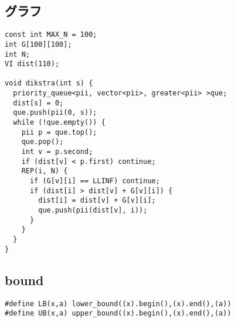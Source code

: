 \documentclass{jsarticle}
\begin{document}
\subsection*{グラフ}
\begin{lstlisting}[caption=ダイクストラ]
const int MAX_N = 100;
int G[100][100];
int N;
VI dist(110);
  
void dikstra(int s) {
  priority_queue<pii, vector<pii>, greater<pii> >que;
  dist[s] = 0;
  que.push(pii(0, s));
  while (!que.empty()) {
    pii p = que.top();
    que.pop();
    int v = p.second;
    if (dist[v] < p.first) continue;
    REP(i, N) {
      if (G[v][i] == LLINF) continue;
      if (dist[i] > dist[v] + G[v][i]) {
        dist[i] = dist[v] + G[v][i];
        que.push(pii(dist[v], i));
      }
    }
  }
}
\end{lstlisting}

\subsection*{bound}
\begin{lstlisting}[caption=bound]
#define LB(x,a) lower_bound((x).begin(),(x).end(),(a))
#define UB(x,a) upper_bound((x).begin(),(x).end(),(a))
\end{lstlisting}
\end{document}
